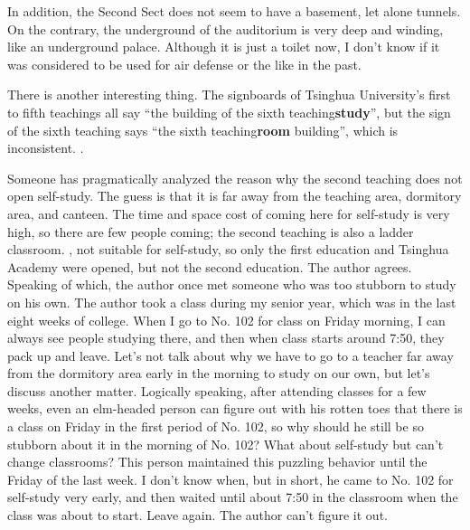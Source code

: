 In addition, the Second Sect does not seem to have a basement, let alone
tunnels.  On the contrary, the underground of the auditorium is very deep and
winding, like an underground palace.  Although it is just a toilet now, I don’t
know if it was considered to be used for air defense or the like in the past.

There is another interesting thing.  The signboards of Tsinghua University’s
first to fifth teachings all say “the building of the sixth
teaching\textbf{study}”, but the sign of the sixth teaching says “the sixth
teaching\textbf{room} building”, which is inconsistent. .

Someone has pragmatically analyzed the reason why the second teaching does not
open self-study. The guess is that it is far away from the teaching area,
dormitory area, and canteen. The time and space cost of coming here for
self-study is very high, so there are few people coming; the second teaching is
also a ladder classroom. , not suitable for self-study, so only the first
education and Tsinghua Academy were opened, but not the second education. The
author agrees.  Speaking of which, the author once met someone who was too
stubborn to study on his own.  The author took a class during my senior year,
which was in the last eight weeks of college. When I go to No. 102 for class on
Friday morning, I can always see people studying there, and then when class
starts around 7:50, they pack up and leave.  Let’s not talk about why we have
to go to a teacher far away from the dormitory area early in the morning to
study on our own, but let’s discuss another matter.  Logically speaking, after
attending classes for a few weeks, even an elm-headed person can figure out
with his rotten toes that there is a class on Friday in the first period of No.
102, so why should he still be so stubborn about it in the morning of No. 102?
What about self-study but can’t change classrooms? This person maintained this
puzzling behavior until the Friday of the last week. I don’t know when, but in
short, he came to No. 102 for self-study very early, and then waited until
about 7:50 in the classroom when the class was about to start. Leave again. The
author can't figure it out.

